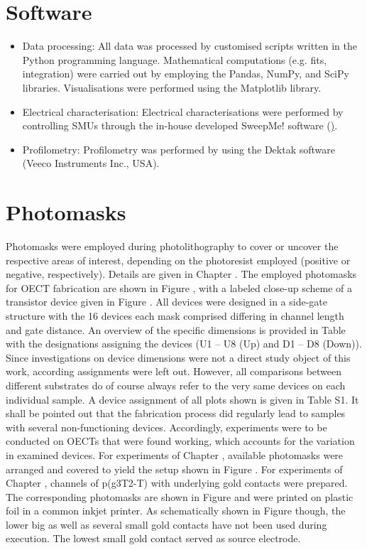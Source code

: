 \section{Software}
\begin{itemize}
\item Data processing: All data was processed by customised scripts written in the Python programming language. Mathematical computations (e.g. fits, integration) were carried out by employing the Pandas, NumPy, and SciPy libraries. Visualisations were performed using the Matplotlib library. 
\item Electrical characterisation: Electrical characterisations were performed by controlling SMUs through the in-house developed SweepMe! software (\href{https://sweep-me.net/}). 
\item Profilometry: Profilometry was performed by using the Dektak software (Veeco Instruments Inc., USA).
\end{itemize}

\section{Photomasks}
Photomasks were employed during photolithography to cover or uncover the respective areas of interest, depending on the photoresist employed (positive or negative, respectively). Details are given in Chapter . The employed photomasks for OECT fabrication are shown in Figure , with a labeled close-up scheme of a transistor device given in Figure . All devices were designed in a side-gate structure with the 16 devices each mask comprised differing in channel length and gate distance. An overview of the specific dimensions is provided in Table  with the designations assigning the devices (U1 – U8 (Up) and D1 – D8 (Down)). Since investigations on device dimensions were not a direct study object of this work, according assignments were left out. However, all comparisons between different substrates do of course always refer to the very same devices on each individual sample. A device assignment of all plots shown is given in Table S1. It shall be pointed out that the fabrication process did regularly lead to samples with several non-functioning devices. Accordingly, experiments were to be conducted on OECTs that were found working, which accounts for the variation in examined devices. For experiments of Chapter , available photomasks were arranged and covered to yield the setup shown in Figure . For experiments of Chapter , channels of p(g3T2-T) with underlying gold contacts were prepared. The corresponding photomasks are shown in Figure  and were printed on plastic foil in a common inkjet printer. As schematically shown in Figure  though, the lower big as well as several small gold contacts have not been used during execution. The lowest small gold contact served as source electrode.


